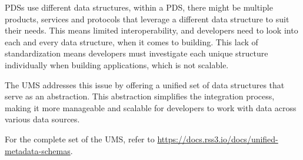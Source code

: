 \glspl{PDS} use different data structures, within a \gls{PDS}, there might be multiple products, services and protocols that leverage a different data structure to suit their needs. This means limited interoperability, and developers need to look into each and every data structure, when it comes to building. This lack of standardization means developers must investigate each unique structure individually when building applications, which is not scalable.

The \gls{UMS} addresses this issue by offering a unified set of data structures that serve as an abstraction. This abstraction simplifies the integration process, making it more manageable and scalable for developers to work with data across various data sources.

For the complete set of the \gls{UMS}, refer to \url{https://docs.rss3.io/docs/unified-metadata-schemas}.
